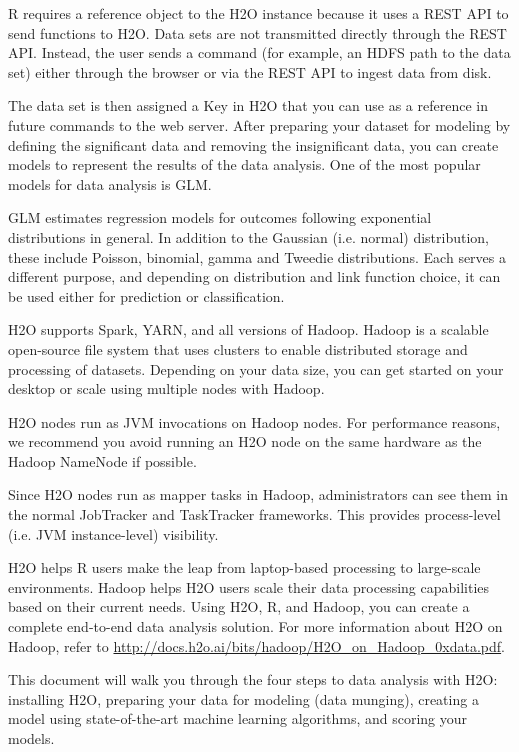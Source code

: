 \documentclass[11pt]{article}
\begin{document}
R requires a reference object to the H2O instance because it uses a REST API to send functions to H2O. Data sets are not transmitted directly through the REST API. Instead, the user sends a command (for example, an HDFS path to the data set) either through the browser or via the REST API to ingest data from disk.

The data set is then assigned a Key in H2O that you can use as a reference in future commands to the web server. After preparing your dataset for modeling by defining the significant data and removing the insignificant data, you can create models to represent the results of the data analysis. One of the most popular models for data analysis is GLM. 

GLM estimates regression models for outcomes following exponential distributions in general. In addition to the Gaussian (i.e. normal) distribution, these include Poisson, binomial, gamma and Tweedie distributions. Each serves a different purpose, and depending on distribution and link function choice, it can be used either for prediction or classification.

H2O supports Spark, YARN, and all versions of Hadoop. Hadoop is a scalable open-source file system that uses clusters to enable distributed storage and processing of datasets. Depending on your data size, you can get started on your desktop or scale using multiple nodes with Hadoop. 

H2O nodes run as JVM invocations on Hadoop nodes. For performance reasons, we recommend you avoid running an H2O node on the same hardware as the Hadoop NameNode if possible.

Since H2O nodes run as mapper tasks in Hadoop, administrators can see them in the normal JobTracker and TaskTracker frameworks. This provides process-level (i.e. JVM instance-level) visibility.

H2O helps R users make the leap from laptop-based processing to large-scale environments. Hadoop helps H2O users scale their data processing capabilities based on their current needs. Using H2O, R, and Hadoop, you can create a complete end-to-end data analysis solution. For more information about H2O on Hadoop, refer to \url{http://docs.h2o.ai/bits/hadoop/H2O\_on\_Hadoop\_0xdata.pdf}.

This document will walk you through the four steps to data analysis with H2O: installing H2O, preparing your data for modeling (data munging), creating a model using state-of-the-art machine learning algorithms, and scoring your models. 
\end{document}
